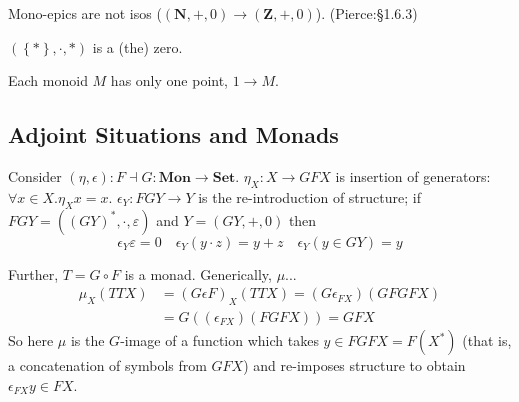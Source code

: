 \documentclass[10pt,twocolumn,letterpaper]{article}
\newcommand{\set}[1]{\left\{{#1}\right\}}
\begin{document}
  Mono-epics are not isos ($(\mathbf{N},+,0) \to (\mathbf{Z},+,0)$).
  (Pierce:\S1.6.3)

  $(\set{*},\cdot,*)$ is a (the) zero.

  Each monoid $M$ has only one point, $1 \to M$.

\subsection{Adjoint Situations and Monads}

  Consider $(\eta, \epsilon) : F \dashv G : \mathbf{Mon} \to \mathbf{Set}$.
  $\eta_X : X \to GFX$ is insertion of generators: $\forall x \in X . \eta_X x = x$.
  $\epsilon_Y : FGY \to Y$ is the re-introduction of structure;
  if $FGY = ((GY)^*, \cdot, \varepsilon)$ and $Y = (GY, +, 0)$ then
    \[ \epsilon_Y \varepsilon = 0
      \quad \epsilon_Y (y \cdot z) =  y + z
      \quad \epsilon_Y (y \in GY)  =  y
    \]

  Further, $T = G \circ F$ is a monad.  Generically, $\mu$...
  \begin{align*}
    \mu_X (TTX) &= (G \epsilon F)_X (TTX) = (G \epsilon_{FX}) (GFGFX) \\
       &= G ((\epsilon_{FX})(FGFX)) = GFX
  \end{align*}
  So here $\mu$ is the $G$-image of a function which takes $y \in FGFX =
  F(X^*)$ (that is, a concatenation of symbols from $GFX$) and re-imposes
  structure to obtain $\epsilon_{FX} y \in FX$.
\end{document}
